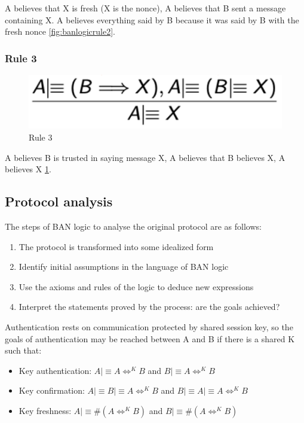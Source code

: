 A believes that X is fresh (X is the nonce), A believes that B sent a message containing X. A believes everything said by B because it was said by B with the fresh nonce \ref{fig:banlogicrule2}.

\subsubsection{Rule 3}

\begin{figure}
	\centering
	\includegraphics[width=0.3\linewidth]{Images/Chapter4/ban_logic_rule3}
	\caption{Rule 3}
	\label{fig:banlogicrule3}
\end{figure}

A believes B is trusted in saying message X, A believes that B believes X, A believes X \ref{fig:banlogicrule3}.

\subsection{Protocol analysis}
The steps of BAN logic to analyse the original protocol are as follows:
\begin{enumerate}
	\item The protocol is transformed into some idealized form
	\item Identify initial assumptions in the language of BAN logic
	\item Use the axioms and rules of the logic to deduce new expressions
	\item Interpret the statements proved by the process: are the goals achieved?
\end{enumerate}

Authentication rests on communication protected by shared session key, so the goals of authentication may be reached between A and B if there is a shared K such that:
\begin{itemize}
	\item Key authentication: $ A \mid \equiv A \Leftrightarrow^K B $ and $ B \mid \equiv A \Leftrightarrow^K B $
	\item Key confirmation: $ A \mid \equiv B \mid \equiv A \Leftrightarrow^K B $ and $ B \mid \equiv A \mid \equiv A \Leftrightarrow^K B $
	\item Key freshness: $ A \mid \equiv \# (A \Leftrightarrow^K B)$ and $ B \mid \equiv \#(A \Leftrightarrow^K B)$
\end{itemize}


